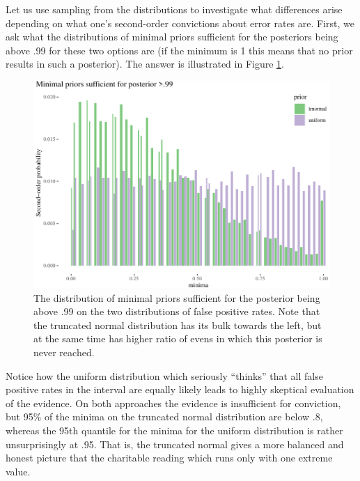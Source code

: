 \documentclass[
  10pt,
  dvipsnames,enabledeprecatedfontcommands]{scrartcl}
\begin{document}
Let us use sampling from the distributions to investigate what
differences arise depending on what one's second-order convictions about
error rates are. First, we ask what the distributions of minimal priors
sufficient for the posteriors being above .99 for these two options are
(if the minimum is 1 this means that no prior results in such a
posterior). The answer is illustrated in Figure \ref{fig:fppMinima}.

\begin{figure}[H]



\begin{center}\includegraphics[width=0.8\linewidth]{chapter-outline_files/figure-latex/fig:fppMinima-1} \end{center}


\caption{The distribution of minimal priors sufficient for the posterior being above .99 on the two distributions of false positive rates. Note that the truncated normal distribution has its bulk towards the left, but at the same time has higher ratio of evens in which this posterior is never reached. }

\label{fig:fppMinima}

\end{figure}

Notice how the uniform distribution which seriously ``thinks'' that all
false positive rates in the interval are equally likely leads to highly
skeptical evaluation of the evidence. On both approaches the evidence is
insufficient for conviction, but 95\% of the minima on the truncated
normal distribution are below .8, whereas the 95th quantile for the
minima for the uniform distribution is rather unsurprisingly at .95.
That is, the truncated normal gives a more balanced and honest picture
that the charitable reading which runs only with one extreme value.
\end{document}
